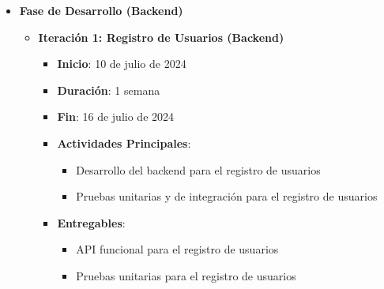 \documentclass{article}
\begin{document}
\begin{itemize}
    \item \textbf{Fase de Desarrollo (Backend)}
          \begin{itemize}
              \item \textbf{Iteración 1: Registro de Usuarios (Backend)}
                    \begin{itemize}
                        \item \textbf{Inicio}: 10 de julio de 2024
                        \item \textbf{Duración}: 1 semana
                        \item \textbf{Fin}: 16 de julio de 2024
                        \item \textbf{Actividades Principales}:
                              \begin{itemize}
                                  \item Desarrollo del backend para el registro de usuarios
                                  \item Pruebas unitarias y de integración para el registro de usuarios
                              \end{itemize}
                        \item \textbf{Entregables}:
                              \begin{itemize}
                                  \item API funcional para el registro de usuarios
                                  \item Pruebas unitarias para el registro de usuarios
                              \end{itemize}
                    \end{itemize}


\end{itemize}
\end{itemize}
\end{document}
